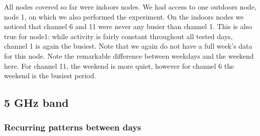 \documentclass[a4paper, 11pt]{article}
\begin{document}
All nodes covered so far were indoors nodes. We had access to one outdoors node, node 1, on which we also performed the experiment. On the indoors nodes we noticed that channel 6 and 11 were never any busier than channel 1. This is also true for node1: while activity is fairly constant throughout all tested days, channel 1 is again the busiest. Note that we again do not have a full week's data for this node. Note the remarkable difference between weekdays and the weekend here. For channel 11, the weekend is more quiet, however for channel 6 the weekend is the busiest period.


\subsection{5 GHz band}
\subsubsection{Recurring patterns between days}
\end{document}
